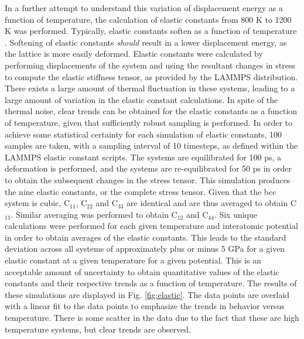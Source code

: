 \documentclass[review]{elsarticle}
\begin{document}
\FloatBarrier

In a further attempt to understand this variation of displacement energy as a function of temperature, the calculation of elastic constants from 800 K to 1200 K was performed. Typically, elastic constants soften as a function of temperature \cite{varshni1970}. Softening of elastic constants \textit{should} result in a lower displacement energy, as the lattice is more easily deformed. Elastic constants were calculated by performing displacements of the system and using the resultant changes in stress to compute the elastic stiffness tensor, as provided by the LAMMPS distribution. There exists a large amount of thermal fluctuation in these systems, leading to a large amount of variation in the elastic constant calculations. In spite of the thermal noise, clear trends can be obtained for the elastic constants as a function of temperature, given that sufficiently robust sampling is performed. In order to achieve some statistical certainty for each simulation of elastic constants, 100 samples are taken, with a sampling interval of 10 timesteps, as defined within the LAMMPS elastic constant scripts. The systems are equilibrated for 100 ps, a deformation is performed, and the systems are re-equilibrated for 50 ps in order to obtain the subsequent changes in the stress tensor. This simulation produces the nine elastic constants, or the complete stress tensor. Given that the bcc system is cubic, C$_{11}$, C$_{22}$ and C$_{33}$ are identical and are thus averaged to obtain C$_{11}$. Similar averaging was performed to obtain C$_{12}$ and C$_{44}$. Six unique calculations were performed for each given temperature and interatomic potential in order to obtain averages of the elastic constants. This leads to the standard deviation across all systems of approximately plus or minus 5 GPa for a given elastic constant at a given temperature for a given potential. This is an acceptable amount of uncertainty to obtain quantitative values of the elastic constants and their respective trends as a function of temperature. The results of these simulations are displayed in Fig. \ref{fig:elastic}. The data points are overlaid with a linear fit to the data points to emphasize the trends in behavior versus temperature. There is some scatter in the data due to the fact that these are high temperature systems, but clear trends are observed. 
\end{document}
